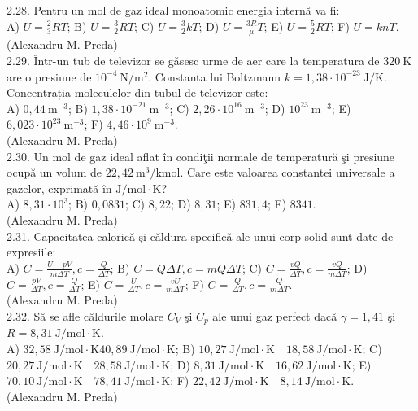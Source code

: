 2.28. Pentru un mol de gaz ideal monoatomic energia internă va fi:\\ A) $U=\frac{2}{3} R T$; B) $U=\frac{3}{2} R T$; C) $U=\frac{3}{2} k T$; D) $U=\frac{3 R}{\mu} T$; E) $U=\frac{5}{2} R T$; F) $U=k n T$.\\ (Alexandru M. Preda)\\

2.29. Într-un tub de televizor se gǎsesc urme de aer care la temperatura de $320 \mathrm{~K}$ are o presiune de $10^{-4} \mathrm{~N} / \mathrm{m}^{2}$. Constanta lui Boltzmann $k=1,38 \cdot 10^{-23} \mathrm{~J} / \mathrm{K}$. Concentrația moleculelor din tubul de televizor este:\\ A) $0,44 \mathrm{~m}^{-3}$; B) $1,38 \cdot 10^{-21} \mathrm{~m}^{-3}$; C) $2,26 \cdot 10^{16} \mathrm{~m}^{-3}$; D) $10^{23} \mathrm{~m}^{-3}$; E) $6,023 \cdot 10^{23} \mathrm{~m}^{-3}$; F) $4,46 \cdot 10^{9} \mathrm{~m}^{-3}$.\\ (Alexandru M. Preda)\\

2.30. Un mol de gaz ideal aflat în condiţii normale de temperatură şi presiune ocupă un volum de $22,42 \mathrm{~m}^{3} / \mathrm{kmol}$. Care este valoarea constantei universale a gazelor, exprimată în $\mathrm{J} / \mathrm{mol} \cdot \mathrm{K}$?\\ A) $8,31 \cdot 10^{3}$; B) $0,0831$; C) $8,22$; D) $8,31$; E) $831,4$; F) $8341$.\\ (Alexandru M. Preda)\\

2.31. Capacitatea calorică şi căldura specifică ale unui corp solid sunt date de expresiile:\\ A) $C=\frac{U-p V}{m \Delta T}, c=\frac{Q}{\Delta T}$; B) $C=Q \Delta T, c=m Q \Delta T$; C) $C=\frac{v Q}{\Delta T}, c=\frac{v Q}{m \Delta T}$; D) $C=\frac{p V}{\Delta T}, c=\frac{Q}{\Delta T}$; E) $C=\frac{U}{\Delta T}, c=\frac{v U}{m \Delta T}$; F) $C=\frac{Q}{\Delta T}, c=\frac{Q}{m \Delta T}$.\\ (Alexandru M. Preda)\\

2.32. Să se afle căldurile molare $C_{V}$ şi $C_{p}$ ale unui gaz perfect dacă $\gamma=1,41$ şi $R=8,31 \mathrm{~J} / \mathrm{mol} \cdot \mathrm{K}$.\\ A) $32,58 \mathrm{~J} / \mathrm{mol} \cdot \mathrm{K} 40,89 \mathrm{~J} / \mathrm{mol} \cdot \mathrm{K}$; B) $10,27 \mathrm{~J} / \mathrm{mol} \cdot \mathrm{K} \quad 18,58 \mathrm{~J} / \mathrm{mol} \cdot \mathrm{K}$; C) $20,27 \mathrm{~J} / \mathrm{mol} \cdot \mathrm{K} \quad 28,58 \mathrm{~J} / \mathrm{mol} \cdot \mathrm{K}$; D) $8,31 \mathrm{~J} / \mathrm{mol} \cdot \mathrm{K} \quad 16,62 \mathrm{~J} / \mathrm{mol} \cdot \mathrm{K}$; E) $70,10 \mathrm{~J} / \mathrm{mol} \cdot \mathrm{K} \quad 78,41 \mathrm{~J} / \mathrm{mol} \cdot \mathrm{K}$; F) $22,42 \mathrm{~J} / \mathrm{mol} \cdot \mathrm{K} \quad 8,14 \mathrm{~J} / \mathrm{mol} \cdot \mathrm{K}$.\\ (Alexandru M. Preda)\\

